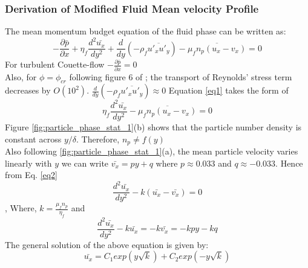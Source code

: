 \documentclass[notitlepage]{revtex4-1}
\begin{document}
\subsubsection{\textbf{Derivation of Modified Fluid Mean velocity Profile}}
\label{sec:derivation_mean_vel}
The mean momentum budget equation of the fluid phase can be written as:
\begin{equation}
   	-\frac{\partial\bar{p}}{\partial x }+\eta_f\frac{d^2\bar{u_x}}{dy^2}+\frac{d}{dy}(-\rho_f\overline{u'_x u'_y})-\overline{\mu_fn_p(u_x-v_x)}=0
   	\label{eq1}
  \end{equation}
  For turbulent Couette-flow 
  \begin{math}
  -\frac{\partial\bar{p}}{\partial x }=0
  \end{math}
  \\Also, for $\phi=\phi_{cr}$ following figure 6 of \citet{ghosh2022part1} ; the transport of Reynolds' stress term decreases by $O(10^{2})$.   
  \begin{math}
  \frac{d}{dy}(-\rho_f\overline{u'_x u'_y})\approx0
  \end{math}
  Equation \ref{eq1} takes the form of
  \begin{equation}
   	\eta_f\frac{d^2\bar{u_x}}{dy^2}-\overline{\mu_fn_p(u_x-v_x)}=0
   	\label{eq2}
  \end{equation}
  Figure \ref{fig:particle_phase_stat_1}(b) shows that the particle number density is constant across $y/\delta$. Therefore, 
  \begin{math}
  n_p\neq f(y)
  \end{math}
   \\ Also following \ref{fig:particle_phase_stat_1}(a), the mean particle velocity varies linearly with $y$ we can write
  \begin{math}
  \bar{v_x}=py+q
  \end{math}
  where $p\approx0.033$ and $q\approx-0.033$.
  Hence from Eq. \ref{eq2}
  \begin{equation} \nonumber
   	\frac{d^2\bar{u_x}}{dy^2}-k(\bar{u_x}-\bar{v_x})=0
  \end{equation}, 
  Where, $k=\frac{\mu_fn_p}{\eta_f}$ and
 \\ \begin{equation}
   	\frac{d^2\bar{u_x}}{dy^2}-k\bar{u_x}=-k\bar{v_x}=-kpy-kq
   	\label{eq3}
    \end{equation}
    The general solution of the above equation is given by:
    \begin{equation}\nonumber
        \bar{u_x}=C_1 exp(y\sqrt{k})+C_2 exp(-y\sqrt{k})
    \end{equation}
\end{document}
